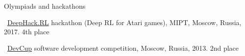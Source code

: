 \documentclass{resume} %
\begin{document}

\begin{rSection}{Olympiads and hackathons}
\item \faExternalLink~\href{http://rl.deephack.me/}{DeepHack.RL} hackathon (Deep RL for Atari games), MIPT, Moscow, Russia, 2017. 4th place
\item \faExternalLink~\href{https://vk.com/devcup}{DevCup} software development competition, Moscow, Russia, 2013. 2nd place
\end{rSection}
\end{document}
